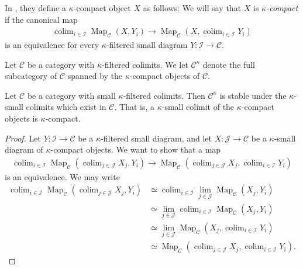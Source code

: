 \documentclass[a4paper,dvipdfmx,11pt,reqno]{amsart}
\DeclareMathOperator{\Map}{Map}
\DeclareMathOperator*{\colim}{colim}
\newcommand{\C}{\mathcal{C}}
\newcommand{\I}{\mathcal{I}}
\newcommand{\J}{\mathcal{J}}
\begin{document}
\begin{remark} \label{rem.not_equiv_def_of_compact} 
  In \cite{KNP}, they define a $\kappa$-compact object $X$ as follows: 
  We will say that $X$ is \textit{$\kappa$-compact} if the canonical map 
  \begin{align*}
    \colim_{i \in \I}\Map_{\C}(X,Y_i) \to \Map_{\C}(X,\colim_{i \in \I} Y_i)
  \end{align*}
  is an equivalence for every $\kappa$-filtered small diagram $Y : \I \to \C$.
\end{remark}

\begin{notation}
  Let $\C$ be a category with $\kappa$-filtered colimits.
  We let $\C^{\kappa}$ denote the full subcategory of $\C$ spanned by the $\kappa$-compact objects of $\C$.
\end{notation}

\begin{proposition} \label{HTT.5.3.4.15}
  Let $\C$ be a category with small $\kappa$-filtered colimits.
  Then $\C^\kappa$ is stable under the $\kappa$-small colimits which exist in $\C$.
  That is, a $\kappa$-small colimit of the $\kappa$-compact objects is $\kappa$-compact. 
\end{proposition}

\begin{proof}
  Let $Y : \I \to \C$ be a $\kappa$-filtered small diagram, and let $X : \J \to \C$ be a $\kappa$-small diagram of $\kappa$-compact objects.
  We want to show that a map
  \begin{align*}
    \colim_{i \in \I}\Map_{\C}(\colim_{j \in \J}X_j, Y_i) \to \Map_{\C}(\colim_{j \in \J}X_j, \colim_{i \in \I}Y_i)
  \end{align*}
  is an equivalence.
  We may write
  \begin{align*}
    \colim_{i \in \I}\Map_{\C}(\colim_{j \in \J}X_j, Y_i) 
    &\simeq \colim_{i \in \I}\lim_{j \in \J}\Map_{\C}(X_j,Y_i) \\
    &\simeq \lim_{j \in \J}\colim_{i \in \I}\Map_{\C}(X_j,Y_i) \\
    &\simeq \lim_{j \in \J}\Map_{\C}(X_j,\colim_{i \in \I}Y_i) \\
    &\simeq \Map_{\C}(\colim_{j \in \J}X_j,\colim_{i \in \I}Y_i).
  \end{align*}
\end{proof}
\end{document}
